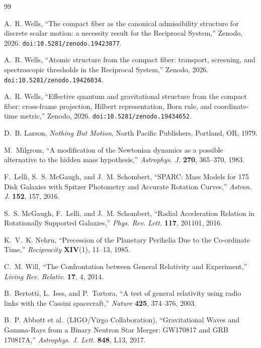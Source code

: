 \documentclass[11pt,a4paper]{article}
\begin{document}
\begin{thebibliography}{99}

A.~R. Wells,
``The compact fiber as the canonical admissibility structure for discrete scalar motion: a necessity result for the Reciprocal System,''
Zenodo, 2026.
\texttt{doi:10.5281/zenodo.19423877}.

A.~R. Wells,
``Atomic structure from the compact fiber: transport, screening, and spectroscopic thresholds in the Reciprocal System,''
Zenodo, 2026.
\texttt{doi:10.5281/zenodo.19426034}.

A.~R. Wells,
``Effective quantum and gravitational structure from the compact fiber: cross-frame projection, Hilbert representation, Born rule, and coordinate-time metric,''
Zenodo, 2026.
\texttt{doi:10.5281/zenodo.19434652}.

D.~B. Larson,
\emph{Nothing But Motion},
North Pacific Publishers, Portland, OR, 1979.

M.~Milgrom,
``A modification of the Newtonian dynamics as a possible alternative to the hidden mass hypothesis,''
\emph{Astrophys. J.} \textbf{270}, 365--370, 1983.

F.~Lelli, S.~S. McGaugh, and J.~M. Schombert,
``SPARC: Mass Models for 175 Disk Galaxies with Spitzer Photometry and Accurate Rotation Curves,''
\emph{Astron. J.} \textbf{152}, 157, 2016.

S.~S. McGaugh, F.~Lelli, and J.~M. Schombert,
``Radial Acceleration Relation in Rotationally Supported Galaxies,''
\emph{Phys. Rev. Lett.} \textbf{117}, 201101, 2016.

K.~V.~K. Nehru,
``Precession of the Planetary Perihelia Due to the Co-ordinate Time,''
\emph{Reciprocity} \textbf{XIV}(1), 11--13, 1985.

C.~M. Will,
``The Confrontation between General Relativity and Experiment,''
\emph{Living Rev. Relativ.} \textbf{17}, 4, 2014.

B.~Bertotti, L.~Iess, and P.~Tortora,
``A test of general relativity using radio links with the Cassini spacecraft,''
\emph{Nature} \textbf{425}, 374--376, 2003.

B.~P. Abbott et al.\ (LIGO/Virgo Collaboration),
``Gravitational Waves and Gamma-Rays from a Binary Neutron Star Merger: GW170817 and GRB 170817A,''
\emph{Astrophys. J. Lett.} \textbf{848}, L13, 2017.

\end{thebibliography}
\end{document}
